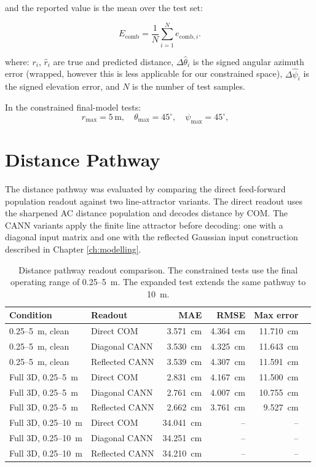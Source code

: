 and the reported value is the mean over the test set:

\begin{equation}
    E_{\mathrm{comb}}
    =
    \frac{1}{N}
    \sum_{i=1}^{N}
    e_{\mathrm{comb},i}.
\end{equation}


where: $r_i$, $\hat{r}_i$ are true and predicted distance, $\Delta \hat{\theta}_i$ is the signed angular azimuth error (wrapped, however this is less applicable for our constrained space), $\Delta \hat{\psi}_i$ is the signed elevation error, and $N$ is the number of test samples.

In the constrained final-model tests:
\begin{equation}
    r_{\max}=5\,\mathrm{m}, \quad
    \theta_{\max}=45^\circ, \quad
    \psi_{\max}=45^\circ, \quad
\end{equation}

\section{Distance Pathway}

The distance pathway was evaluated by comparing the direct feed-forward population readout against two line-attractor variants. The direct readout uses the sharpened AC distance population and decodes distance by COM. The CANN variants apply the finite line attractor before decoding: one with a diagonal input matrix and one with the reflected Gaussian input construction described in Chapter \ref{ch:modelling}.

\begin{table}[H]
    \centering
    \caption{Distance pathway readout comparison. The constrained tests use the final operating range of 0.25--5~m. The expanded test extends the same pathway to 10~m.}
    \label{tab:distance_pathway_results}
    \small
    \begin{tabular}{llrrrr}
        \toprule
        Condition & Readout & MAE & RMSE & Max error \\
        \midrule
        0.25--5~m, clean & Direct COM & 3.571~cm & 4.364~cm & 11.710~cm \\
        0.25--5~m, clean & Diagonal CANN & 3.530~cm & 4.325~cm & 11.643~cm  \\
        0.25--5~m, clean & Reflected CANN & 3.539~cm & 4.307~cm & 11.591~cm  \\
        \midrule
        Full 3D, 0.25--5~m & Direct COM & 2.831~cm & 4.167~cm & 11.500~cm  \\
        Full 3D, 0.25--5~m & Diagonal CANN & 2.761~cm & 4.007~cm & 10.755~cm  \\
        Full 3D, 0.25--5~m & Reflected CANN & 2.662~cm & 3.761~cm & 9.527~cm  \\
        \midrule
        Full 3D, 0.25--10~m & Direct COM & 34.041~cm & -- & -- \\
        Full 3D, 0.25--10~m & Diagonal CANN & 34.251~cm & -- & -- \\
        Full 3D, 0.25--10~m & Reflected CANN & 34.210~cm & -- & -- \\
        \bottomrule
    \end{tabular}
\end{table}

